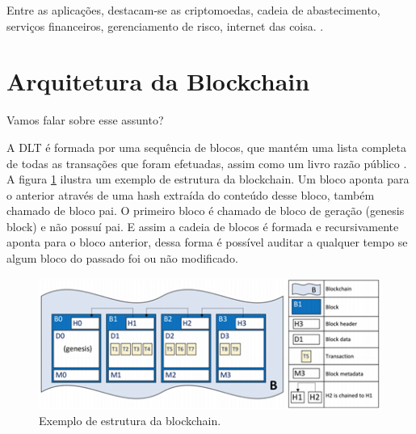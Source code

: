 


Entre as aplicações, destacam-se as criptomoedas, cadeia de abastecimento, serviços financeiros, gerenciamento de risco, internet das coisa. \cite{pinno2017controlchain}\cite{zheng2018blockchain}\cite{monrat2019survey}. 

\section{Arquitetura da Blockchain}
Vamos falar sobre esse assunto?

A DLT é formada por uma sequência de blocos, que mantém uma lista completa de todas as transações que foram efetuadas, assim como um livro razão público \cite{zheng2018blockchain}. A figura \ref{fig:blockchain-structure} ilustra um exemplo de estrutura da blockchain. Um bloco aponta para o anterior através de uma hash extraída do conteúdo desse bloco, também chamado de bloco pai. O primeiro bloco é chamado de bloco de geração (genesis block) e não possuí pai. E assim a cadeia de blocos é formada e recursivamente aponta para o bloco anterior, dessa forma é possível auditar a qualquer tempo se algum bloco do passado foi ou não modificado. 

\begin{figure}[!htb]
\centering
\includegraphics[width=12cm]{2-fundam/blockchain-structure.png}
\caption{Exemplo de estrutura da blockchain.}
\label{fig:blockchain-structure}
\end{figure}

